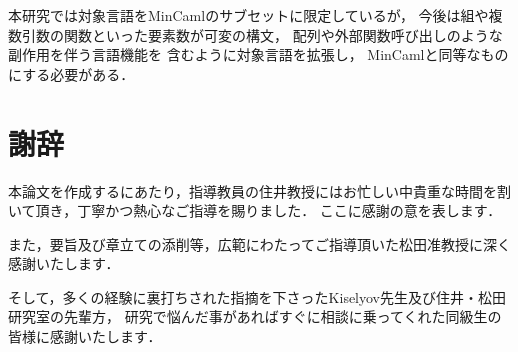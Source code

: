 \documentclass[T]{compsoft}
\begin{document}
本研究では対象言語をMinCamlのサブセットに限定しているが，
今後は組や複数引数の関数といった要素数が可変の構文，
配列や外部関数呼び出しのような副作用を伴う言語機能を
含むように対象言語を拡張し，
MinCamlと同等なものにする必要がある．

\section*{謝辞}

本論文を作成するにあたり，指導教員の住井教授にはお忙しい中貴重な時間を割いて頂き，丁寧かつ熱心なご指導を賜りました．
ここに感謝の意を表します．

また，要旨及び章立ての添削等，広範にわたってご指導頂いた松田准教授に深く感謝いたします．

そして，多くの経験に裏打ちされた指摘を下さったKiselyov先生及び住井・松田研究室の先輩方，
研究で悩んだ事があればすぐに相談に乗ってくれた同級生の皆様に感謝いたします．



\end{document}
